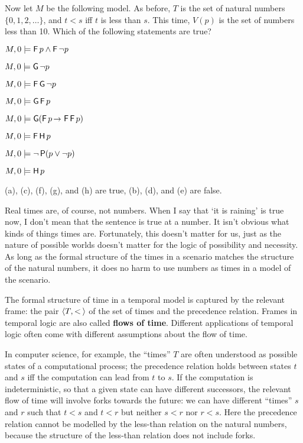 \begin{exercise}
  Now let $M$ be the following model. As before, $T$ is the set of natural
  numbers $\{ 0,1,2,\ldots \}$, and $t < s$ iff $t$ is less than $s$. This
  time, $V(p)$ is the set of numbers less than 10. Which of the following
  statements are true?
  \begin{exlist}
  \item $M,0 \models \tF p \land \tF \neg p$ 
  \item $M,0 \models \tG \neg p$
  \item $M,0 \models \tF\tG \neg p$
  \item $M,0 \models \tG\tF p$
  \item $M,0 \models \tG(\tF p \to \tF\tF p)$
  \item $M,0 \models \tF\tH p$
  \item $M,0 \models \neg \tP(p \lor \neg p)$
  \item $M,0 \models \tH p$
  \end{exlist}
\end{exercise}
\begin{solution}
  (a), (c), (f), (g), and (h) are true, (b), (d), and (e) are false. 
\end{solution}

Real times are, of course, not numbers. When I say that `it is raining' is true
now, I don't mean that the sentence is true at a number. It isn't
obvious what kinds of things times are. Fortunately, this doesn't matter for us,
just as the nature of possible worlds doesn't matter for the logic of
possibility and necessity. As long as the formal structure of the times in a
scenario matches the structure of the natural numbers, it does no harm to use
numbers as times in a model of the scenario.

The formal structure of time in a temporal model is captured by the relevant
frame: the pair $\t{T,<\!}$ of the set of times and the precedence relation.
Frames in temporal logic are also called \textbf{flows of time}. Different
applications of temporal logic often come with different assumptions about the
flow of time.

In computer science, for example, the ``times'' $T$ are often understood as
possible states of a computational process; the precedence relation holds
between states $t$ and $s$ iff the computation can lead from $t$ to $s$. If
the computation is indeterministic, so that a given state can have different
successors, the relevant flow of time will involve forks towards the future: we
can have different ``times'' $s$ and $r$ such that $t<s$ and $t<r$ but neither
$s<r$ nor $r<s$. Here the precedence relation cannot be modelled by the
less-than relation on the natural numbers, because the structure of the
less-than relation does not include forks.

